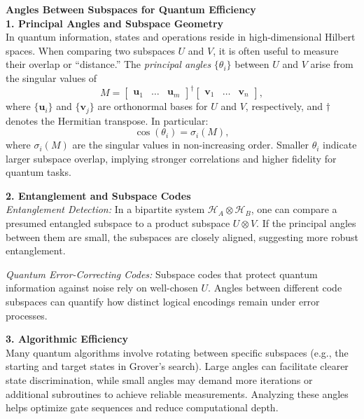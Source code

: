 \begin{technical}
{\Large\textbf{Angles Between Subspaces for Quantum Efficiency}}\\[0.7em]

\noindent\textbf{1. Principal Angles and Subspace Geometry}\\[0.5em]
In quantum information, states and operations reside in high-dimensional Hilbert spaces. When comparing two subspaces \(U\) and \(V\), it is often useful to measure their overlap or “distance.” The \emph{principal angles} \(\{\theta_i\}\) between \(U\) and \(V\) arise from the singular values of
\[
M = \begin{bmatrix}
\mathbf{u}_1 & \dots & \mathbf{u}_m
\end{bmatrix}^{\dagger}
\begin{bmatrix}
\mathbf{v}_1 & \dots & \mathbf{v}_n
\end{bmatrix},
\]
where \(\{\mathbf{u}_i\}\) and \(\{\mathbf{v}_j\}\) are orthonormal bases for \(U\) and \(V\), respectively, and \(\dagger\) denotes the Hermitian transpose. In particular:
\[
\cos(\theta_i) = \sigma_i(M),
\]
where \(\sigma_i(M)\) are the singular values in non-increasing order. Smaller \(\theta_i\) indicate larger subspace overlap, implying stronger correlations and higher fidelity for quantum tasks.

\vspace{0.5em}
\noindent\textbf{2. Entanglement and Subspace Codes}\\[0.5em]
\textit{Entanglement Detection:} In a bipartite system \(\mathcal{H}_A \otimes \mathcal{H}_B\), one can compare a presumed entangled subspace to a product subspace \(U \otimes V\). If the principal angles between them are small, the subspaces are closely aligned, suggesting more robust entanglement.

\noindent\textit{Quantum Error-Correcting Codes:} Subspace codes that protect quantum information against noise rely on well-chosen \(U\). Angles between different code subspaces can quantify how distinct logical encodings remain under error processes.

\vspace{0.5em}
\noindent\textbf{3. Algorithmic Efficiency}\\[0.5em]
Many quantum algorithms involve rotating between specific subspaces (e.g., the starting and target states in Grover’s search). Large angles can facilitate clearer state discrimination, while small angles may demand more iterations or additional subroutines to achieve reliable measurements. Analyzing these angles helps optimize gate sequences and reduce computational depth.


\end{technical}
